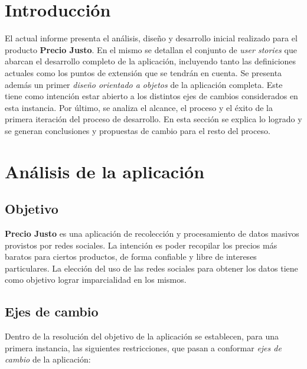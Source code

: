 \documentclass[10pt, a4paper]{article}
\begin{document}
\maketitle
\tableofcontents
\newpage

\section{Introducción}

El actual informe presenta el análisis, diseño y desarrollo inicial realizado para el producto \textbf{Precio Justo}. En el mismo se detallan el conjunto de \emph{user stories} que abarcan el desarrollo completo de la aplicación, incluyendo tanto las definiciones actuales como los puntos de extensión que se tendrán en cuenta. Se presenta además un primer \emph{diseño orientado a objetos} de la aplicación completa. Este tiene como intención estar abierto a los distintos ejes de cambios considerados en esta instancia. Por último, se analiza el alcance, el proceso y el éxito de la primera iteración del proceso de desarrollo. En esta sección se explica lo logrado y se generan conclusiones y propuestas de cambio para el resto del proceso.

\section{Análisis de la aplicación}

\subsection{Objetivo}

\textbf{Precio Justo} es una aplicación de recolección y procesamiento de datos masivos provistos por redes sociales. La intención es poder recopilar los precios más baratos para ciertos productos, de forma confiable y libre de intereses particulares. La elección del uso de las redes sociales para obtener los datos tiene como objetivo lograr imparcialidad en los mismos.

\subsection{Ejes de cambio}

Dentro de la resolución del objetivo de la aplicación se establecen, para una primera instancia, las siguientes restricciones, que pasan a conformar \emph{ejes de cambio} de la aplicación:
\end{document}
